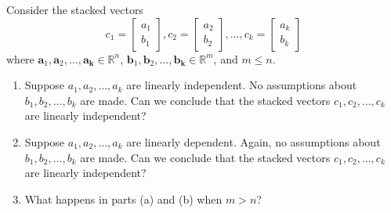 Consider the stacked vectors
$$
	c_1=\left[\begin{array}{l}
			a_1 \\
			b_1
		\end{array}\right], c_2=\left[\begin{array}{l}
			a_2 \\
			b_2
		\end{array}\right], \ldots, c_k=\left[\begin{array}{l}
			a_k \\
			b_k
		\end{array}\right]
$$
where $\mathbf{a}_1, \mathbf{a}_2, \ldots, \mathbf{a}_{\mathbf{k}} \in
	\mathbb{R}^n$,
$\mathbf{b}_1, \mathbf{b}_2, \ldots,
	\mathbf{b}_{\mathbf{k}} \in \mathbb{R}^m$, and $m \leq n$.

\begin{enumerate}[label=(\alph*)]
	\item Suppose $a_1, a_2, \ldots, a_k$ are linearly independent. No
	      assumptions about $b_1, b_2, \ldots, b_k$ are made. Can we conclude that
	      the stacked vectors
	      $c_1, c_2, \ldots, c_k$ are linearly independent?
	\item Suppose $a_1, a_2, \ldots, a_k$ are linearly dependent. Again, no
	      assumptions about $b_1, b_2, \ldots, b_k$ are made. Can we conclude that
	      the stacked vectors
	      $c_1, c_2, \ldots, c_k$ are linearly independent?
	\item What happens in parts (a) and (b) when $m > n$?
\end{enumerate}
